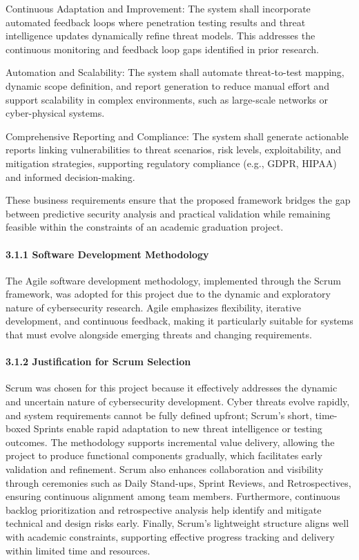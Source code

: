 \documentclass[12pt,a4paper]{report}
\begin{document}
Continuous Adaptation and Improvement: The system shall incorporate automated feedback loops where penetration testing results and threat intelligence updates dynamically refine threat models. This addresses the continuous monitoring and feedback loop gaps identified in prior research.

Automation and Scalability: The system shall automate threat-to-test mapping, dynamic scope definition, and report generation to reduce manual effort and support scalability in complex environments, such as large-scale networks or cyber-physical systems.

Comprehensive Reporting and Compliance: The system shall generate actionable reports linking vulnerabilities to threat scenarios, risk levels, exploitability, and mitigation strategies, supporting regulatory compliance (e.g., GDPR, HIPAA) and informed decision-making.

These business requirements ensure that the proposed framework bridges the gap between predictive security analysis and practical validation while remaining feasible within the constraints of an academic graduation project.

\paragraph{3.1.1 Software Development Methodology}

The Agile software development methodology, implemented through the Scrum framework, was adopted for this project due to the dynamic and exploratory nature of cybersecurity research. Agile emphasizes flexibility, iterative development, and continuous feedback, making it particularly suitable for systems that must evolve alongside emerging threats and changing requirements.

\paragraph{3.1.2 Justification for Scrum Selection}

Scrum was chosen for this project because it effectively addresses the dynamic and uncertain nature of cybersecurity development. Cyber threats evolve rapidly, and system requirements cannot be fully defined upfront; Scrum’s short, time-boxed Sprints enable rapid adaptation to new threat intelligence or testing outcomes. The methodology supports incremental value delivery, allowing the project to produce functional components gradually, which facilitates early validation and refinement. Scrum also enhances collaboration and visibility through ceremonies such as Daily Stand-ups, Sprint Reviews, and Retrospectives, ensuring continuous alignment among team members. Furthermore, continuous backlog prioritization and retrospective analysis help identify and mitigate technical and design risks early. Finally, Scrum’s lightweight structure aligns well with academic constraints, supporting effective progress tracking and delivery within limited time and resources.
\end{document}

